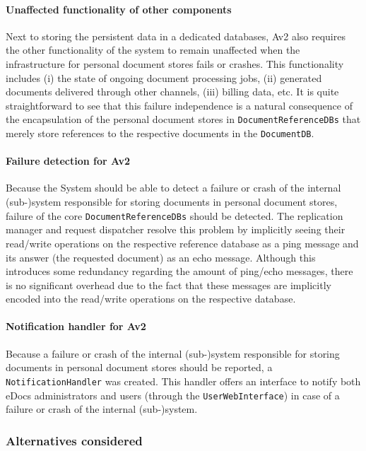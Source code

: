 \documentclass[a4paper,10pt]{article}
\begin{document}
\paragraph{Unaffected functionality of other components}
Next to storing the  persistent data in a dedicated databases, Av2 also requires the other functionality of the system to remain unaffected when the infrastructure for personal document stores fails or crashes. This functionality includes (i) the state of ongoing document processing jobs, (ii) generated documents delivered through other channels, (iii) billing data, etc. It is quite straightforward to see that this failure independence is a natural consequence of the encapsulation of the personal document stores in \texttt{DocumentReferenceDBs} that merely store references to the respective documents in the \texttt{DocumentDB}.

\paragraph{Failure detection for Av2}
Because the System should be able to detect a failure or crash of the internal (sub-)system responsible for storing documents in personal document stores, failure of the core \texttt{DocumentReferenceDBs} should be detected. The replication manager and request dispatcher resolve this problem by implicitly seeing their read/write operations on the respective reference database as a ping message and its answer (the requested document) as an echo message. Although this introduces some redundancy regarding the amount of ping/echo messages, there is no significant overhead due to the fact that these messages are implicitly encoded into the read/write operations on the respective database.

\paragraph{Notification handler for Av2}
Because a failure or crash of the internal (sub-)system responsible for storing documents in personal document stores should be reported, a \texttt{NotificationHandler} was created. This handler offers an interface to notify both eDocs administrators and users (through the \texttt{UserWebInterface}) in case of a failure or crash of the internal (sub-)system.

\subsubsection*{Alternatives considered}
\end{document}
